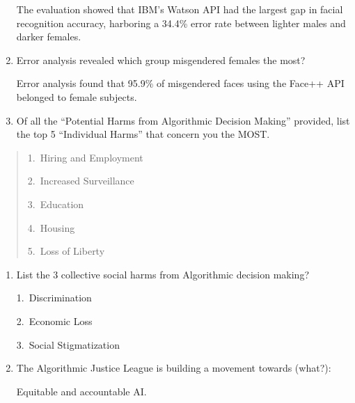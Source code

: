 \documentclass[
]{article}
\begin{document}
\begin{enumerate}
  \textcolor[rgb]{.25,.5,.75}{The evaluation showed that IBM's Watson API had the largest gap in facial recognition accuracy, harboring a 34.4\% error rate between lighter males and darker females.}
\item
  Error analysis revealed which group misgendered females the most?\par
  \textcolor[rgb]{.25,.5,.75}{Error analysis found that 95.9\% of misgendered faces using the Face++ API belonged to female subjects.}
\item
  Of all the ``Potential Harms from Algorithmic Decision Making''
  provided, list the top 5 ``Individual Harms'' that concern you the
  MOST.
\end{enumerate}

\begin{quote}
1.\ \textcolor[rgb]{.25,.5,.75}{Hiring and Employment}

2.\ \textcolor[rgb]{.25,.5,.75}{Increased Surveillance}

3.\ \textcolor[rgb]{.25,.5,.75}{Education}

4.\ \textcolor[rgb]{.25,.5,.75}{Housing}

5.\ \textcolor[rgb]{.25,.5,.75}{Loss of Liberty}
\end{quote}

\begin{enumerate}
\def\labelenumi{\arabic{enumi}.}
\setcounter{enumi}{8}
\item
  List the 3 collective social harms from Algorithmic decision making?\par
  \textcolor[rgb]{.25,.5,.75}{1.\ Discrimination}\par
  \textcolor[rgb]{.25,.5,.75}{2.\ Economic Loss}\par
  \textcolor[rgb]{.25,.5,.75}{3.\ Social Stigmatization}
\item
  The Algorithmic Justice League is building a movement towards (what?):\par
  \textcolor[rgb]{.25,.5,.75}{Equitable and accountable AI.} 
\end{enumerate}
\end{document}
